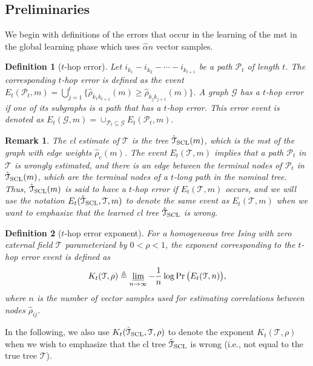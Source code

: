 \documentclass[11pt,onecolumn]{article}
\newcommand{\calG}{\mathcal{G}}
\newcommand{\calP}{\mathcal{P}}
\newcommand{\calT}{\mathcal{T}}
\newcommand{\hatcalT}{\hat{\calT}}
\newcommand{\halpha}{\hat{\alpha}}
\newcommand{\hrho}{\hat{\rho}}
\newtheorem{definition}{Definition}
\newtheorem{remark}{Remark}
\begin{document}
\subsection{Preliminaries}\label{sec:pfpre}
We begin with definitions of the errors that occur in the learning of the \ac{mst} in the global learning phase which uses $\halpha n$ vector samples.  
\begin{definition}[$t$-hop error] \label{def:thop}
	Let $i_{k_{1}}-i_{k_{2}}-\cdots -i_{k_{t+1}}$ be a   path $\calP_{t}$ of length $t$. The corresponding $t$-hop error is defined as the event $E_{t}(\calP_{t},m)=\bigcup_{j=1}^{t}\{\hrho_{k_{1}k_{t+1}}(m)\geq \hrho_{k_{j}k_{j+1}}(m)\}$. A graph 
	$\calG$ has a $t$-hop error if one of its subgraphs is a path that has a $t$-hop error. This error event   is denoted as $E_{t}(\calG,m)=\cup_{\calP_{t} \subseteq \calG}E_{t}(\calP_{t},m).$
\end{definition}
\begin{remark}
	The \ac{cl} estimate of $\calT$ is the tree $\hatcalT_{{\rm SCL}}(m)$, which is the \ac{mst} of the graph with edge weights $\hrho_{e}(m)$. The event $E_{t}(\calT,m)$ implies that a path $\calP_{t}$ in $\calT$ is wrongly estimated, and 
	there is an edge between the terminal nodes of $\calP_{t}$ in $\hatcalT_{{\rm SCL}}(m)$, which are the terminal nodes of a $t$-long path in the nominal tree. Thus, $\hatcalT_{{\rm SCL}}(m)$ is said to have a $t$-hop error if $E_{t}(\calT,m)$ occurs, and 
	we will use the notation $E_{t}(\hatcalT_{{\rm SCL}},\calT,m)$ to denote the same event as $E_{t}(\calT,m)$ when we want to emphasize that the learned \ac{cl} tree $\hatcalT_{{\rm SCL}}$ is wrong.
\end{remark}
\begin{definition}[$t$-hop error exponent]
For a homogeneous tree Ising with zero external field $\calT$ parameterized by $0<\rho<1$, the exponent corresponding to the $t$-hop error event is defined as
\begin{align}\label{eq:thopee}
	K _{t}(\calT,\rho)\triangleq \varliminf_{n\rightarrow \infty}-\frac{1}{n}\log\Pr \big(E_{t}(\calT,n)\big),
\end{align}
where $n$ is the number of vector samples used for estimating correlations between nodes $\hrho_{ij}$.
\end{definition} 
In the following, we also use $K _{t}(\hatcalT_{{\rm SCL}},\calT,\rho)$ to denote the exponent $K _{t}(\calT,\rho)$ when we wish to emphasize that the \ac{cl} tree $\hatcalT_{{\rm SCL}}$ is wrong (i.e., not equal to the true tree $\calT$). 
\end{document}
